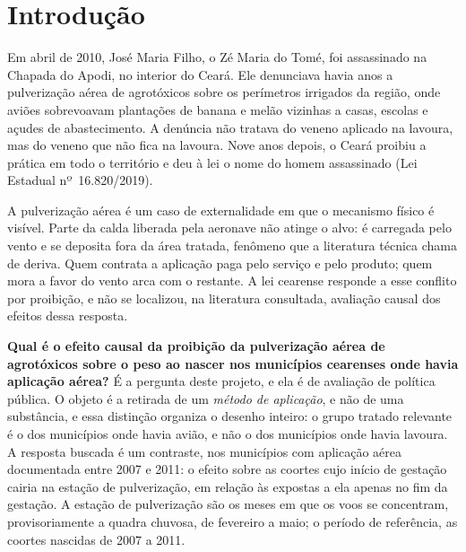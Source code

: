 
\chapter{Introdução}
\label{cap:introducao}

Em abril de 2010, José Maria Filho, o Zé Maria do Tomé, foi assassinado na
Chapada do Apodi, no interior do Ceará. Ele denunciava havia anos a
pulverização aérea de agrotóxicos sobre os perímetros irrigados da região, onde
aviões sobrevoavam plantações de banana e melão vizinhas a casas, escolas e
açudes de abastecimento. A denúncia não tratava do veneno aplicado na lavoura,
mas do veneno que não fica na lavoura. Nove anos depois, o Ceará proibiu a
prática em todo o território e deu à lei o nome do homem assassinado (Lei
Estadual nº~16.820/2019).

A pulverização aérea é um caso de externalidade em que o mecanismo físico é
visível. Parte da calda liberada pela aeronave não atinge o alvo: é carregada
pelo vento e se deposita fora da área tratada, fenômeno que a literatura
técnica chama de deriva. Quem contrata a aplicação paga pelo serviço e pelo
produto; quem mora a favor do vento arca com o restante. A lei cearense
responde a esse conflito por proibição, e não se localizou, na literatura
consultada, avaliação causal dos efeitos dessa resposta.

\textbf{Qual é o efeito causal da proibição da pulverização aérea de
agrotóxicos sobre o peso ao nascer nos municípios cearenses onde havia
aplicação aérea?} É a pergunta deste projeto, e ela é de avaliação de política
pública. O objeto é a retirada de um \emph{método de aplicação}, e não de uma
substância, e essa distinção organiza o desenho inteiro: o grupo tratado
relevante é o dos municípios onde havia avião, e não o dos municípios onde
havia lavoura. A resposta buscada é um contraste, nos municípios com aplicação
aérea documentada entre 2007 e 2011: o efeito sobre as coortes cujo início de
gestação cairia na estação de pulverização, em relação às expostas a ela
apenas no fim da gestação. A estação de pulverização são os meses em que os voos se
concentram, provisoriamente a quadra chuvosa, de fevereiro a maio; o período
de referência, as coortes nascidas de 2007 a 2011.

